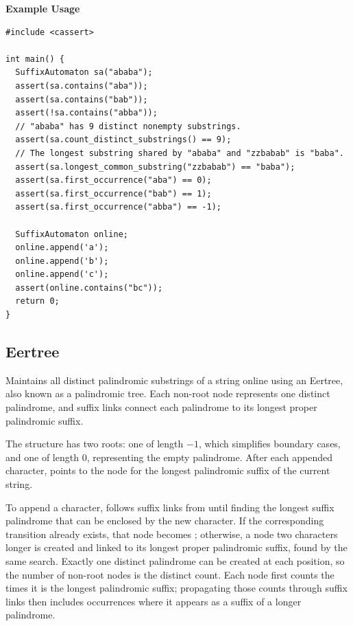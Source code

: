 \textbf{Example Usage}\par
\begin{lstlisting}[style=cpp]
#include <cassert>

int main() {
  SuffixAutomaton sa("ababa");
  assert(sa.contains("aba"));
  assert(sa.contains("bab"));
  assert(!sa.contains("abba"));
  // "ababa" has 9 distinct nonempty substrings.
  assert(sa.count_distinct_substrings() == 9);
  // The longest substring shared by "ababa" and "zzbabab" is "baba".
  assert(sa.longest_common_substring("zzbabab") == "baba");
  assert(sa.first_occurrence("aba") == 0);
  assert(sa.first_occurrence("bab") == 1);
  assert(sa.first_occurrence("abba") == -1);

  SuffixAutomaton online;
  online.append('a');
  online.append('b');
  online.append('c');
  assert(online.contains("bc"));
  return 0;
}
\end{lstlisting}
\subsection{Eertree}
\label{sec:3.5.5}
Maintains all distinct palindromic substrings of a string online using an Eertree, also known as a palindromic tree. Each non-root node represents one distinct palindrome, and suffix links connect each palindrome to its longest proper palindromic suffix.

The structure has two roots: one of length $-1$, which simplifies boundary cases, and one of length $0$, representing the empty palindrome. After each appended character,  points to the node for the longest palindromic suffix of the current string.

To append a character,  follows suffix links from  until finding the longest suffix palindrome that can be enclosed by the new character. If the corresponding transition already exists, that node becomes ; otherwise, a node two characters longer is created and linked to its longest proper palindromic suffix, found by the same search. Exactly one distinct palindrome can be created at each position, so the number of non-root nodes is the distinct count. Each node first counts the times it is the longest palindromic suffix; propagating those counts through suffix links then includes occurrences where it appears as a suffix of a longer palindrome.

